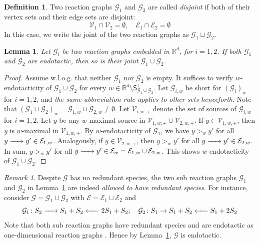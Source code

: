\documentclass[10pt]{amsart}
\numberwithin{equation}{section}
\theoremstyle{plain}
\newtheorem{lemma}[theorem]{Lemma}
\theoremstyle{definition}
\newtheorem{definition}[theorem]{Definition}
\theoremstyle{remark}
\newtheorem{remark}[theorem]{Remark}
\newcommand{\cE}{\mathcal{E}}
\newcommand{\cG}{\mathcal{G}}
\newcommand{\cV}{\mathcal{V}}
\begin{document}
 \begin{definition}
 Two reaction graphs $\cG_1$ and $\cG_2$ are called \emph{disjoint} if both of their vertex sets and their edge sets are disjoint: $$\cV_1\cap\cV_2=\emptyset,\quad\cE_1\cap\cE_2=\emptyset$$ In this case, we write the joint of the two reaction graphs as $\cG_1\sqcup\cG_2$.
 \end{definition}

\begin{lemma}\label{le:endotacticity-preserved-under-joint}
Let $\cG_i$ be two reaction graphs  embedded in $\mathbb{R}^d$, for $i=1,2$. If both $\cG_1$ and $\cG_2$ are endotactic, then so is their joint $\cG_1\cup\cG_2$.
\end{lemma}
\begin{proof}
Assume w.l.o.g. that neither $\cG_1$ nor $\cG_2$ is empty. It suffices to verify $w$-endotacticity of $\cG_1\cup\cG_2$ for every $w\in\mathbb{R}^d\setminus\mathsf{S}_{\cG_1\cup\cG_2}^{\perp}$. Let $\cG_{i,w}$ be short for $(\cG_i)_{w}$ for $i=1,2$, and \emph{the same abbreviation rule applies to other sets henceforth}.  Note that $(\cG_1\cup\cG_2)_w=\cG_{1,w}\cup\cG_{2,w}\neq\emptyset$. Let $\cV_{i,w,+}$ denote the set of sources of $\cG_{i,w}$ for $i=1,2$. Let $y$ be any $w$-maximal source in $\cV_{1,w,+}\cup\cV_{2,w,+}$. If $y\in\cV_{1,w,+}$, then $y$ is  $w$-maximal in $\cV_{1,w,+}$. By $w$-endotacticity of $\cG_1$, we have $y>_{w}y'$ for all $y\ce{->[]} y'\in\cE_{1,w}$. Analogously, if $y\in\cV_{2,w,+}$, then $y>_{w}y'$ for all $y\ce{->[]} y'\in\cE_{2,w}$. In sum, $y>_{w}y'$ for all $y\ce{->[]} y'\in\cE_{w}=\cE_{1,w}\cup\cE_{2,w}$. This shows $w$-endotacticity of $\cG_1\cup\cG_2$.
\end{proof}
\begin{remark}
Despite $\cG$ has no redundant species, the two sub reaction graphs $\cG_1$ and $\cG_2$ in Lemma~\ref{le:endotacticity-preserved-under-joint} are indeed \emph{allowed to have redundant species}. For instance, consider $\cG=\cG_1\cup\cG_2$ with $\cE=\cE_1\sqcup\cE_2$ and $$\cG_1\colon S_2\ce{->[]} S_1+S_2\ce{<-[]} 2S_1+S_2;\quad \cG_2\colon S_1\to S_1+S_2\ce{<-[]} S_1+2S_2$$ Note that both sub reaction graphs have redundant species and are endotactic as one-dimensional reaction graphs \cite[Remark~3.11]{GMS14}. Hence by Lemma~\ref{le:endotacticity-preserved-under-joint}, $\cG$ is endotactic.
\end{remark}
\end{document}
